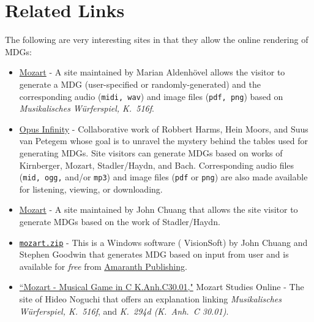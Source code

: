 \documentclass[letterpaper,x11names,svgnames,10pt]{article}
\begin{document}
\section{Related Links}
The following are very interesting sites in that they allow the online rendering of MDGs:
\begin{itemize}
	\item  \href{https://marian-aldenhoevel.de/mozart/}{Mozart} - A site maintained by Marian Aldenh\"{o}vel allows the visitor to generate a MDG (user-specified or randomly-generated) and the corresponding audio ({\tt midi, wav}) and image files ({\tt pdf, png}) based on {\em Musikalisches W\"{u}rferspiel, K.\ 516f}.
	
	\item \href{https://opus-infinity.org}{Opus Infinity} - Collaborative work of Robbert Harms, Hein Moors, and Suus van Petegem whose goal is to unravel the mystery behind the tables used for generating MDGs.  Site visitors can generate MDGs based on works of Kirnberger, Mozart, Stadler/Haydn, and Bach.  Corresponding audio files ({\tt mid, ogg,} and/or {\tt mp3}) and image files ({\tt pdf} or {\tt png}) are also made available for listening, viewing, or downloading.
	
	\item  \href{http://sunsite.univie.ac.at/Mozart/dice/}{Mozart} - A site maintained by John Chuang that allows the site visitor to generate MDGs based on the work of Stadler/Haydn.
 	
 	\item \href{https://www.amaranthpublishing.com/mozart.zip}{\tt mozart.zip} -  This is a Windows software ( VisionSoft) by John Chuang and Stephen Goodwin that generates MDG based on input from user and is available for {\it free} from  \href{http://www.amaranthpublishing.com/MozartDiceGame.htm}{Amaranth Publishing}.  
 	
 	\item \href{(http://www.asahi-net.or.jp/\~rb5h-ngc/e/k516f.htm}{``Mozart - Musical Game in C K.Anh.C30.01,"}	Mozart Studies Online - The site of Hideo Noguchi that offers an explanation linking {\em Musikalisches W\"{u}rferspiel, K.\ 516f}, and  {\em K.\ 294d (K.\ Anh.\ C 30.01)}. 
\end{itemize}
\end{document}
